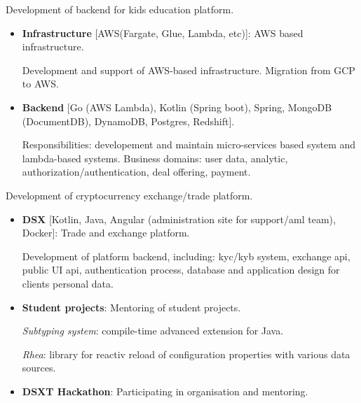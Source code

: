 \documentclass{cv}
\begin{document}
\begin{cvblock}{%
		}

	Development of backend for kids education platform.

	\begin{itemize}
		\item \textbf{Infrastructure} [AWS(Fargate, Glue, Lambda, etc)]: AWS based infrastructure.

		      Development and support of AWS-based infrastructure. Migration from GCP to AWS.

		\item \textbf{Backend} [Go (AWS Lambda), Kotlin (Spring boot), Spring, MongoDB (DocumentDB), DynamoDB, Postgres, Redshift].

		      Responsibilities: developement and maintain micro-services based system and lambda-based systems. Business domains:
		      user data, analytic, authorization/authentication, deal offering, payment.
	\end{itemize}
\end{cvblock}

\begin{cvblock}{%
		}

	Development of cryptocurrency exchange/trade platform.

	\begin{itemize}
		\item \textbf{DSX} [Kotlin, Java, Angular (administration site for support/aml team), Docker]: Trade and exchange platform.

		      Development of platform backend, including:
		      kyc/kyb system, exchange api, public UI api, authentication process,
		      database and application design for clients personal data.
		\item \textbf{Student projects}: Mentoring of student projects.

		      \emph{Subtyping system}: compile-time advanced extension for Java.

		      \emph{Rhea}: library for reactiv reload of configuration properties with various data sources.

		\item \textbf{DSXT Hackathon}: Participating in organisation and mentoring.
	\end{itemize}
\end{cvblock}
\end{document}
